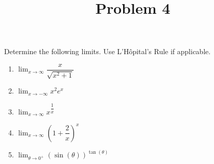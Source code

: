 \documentclass{ximera}
\title[Problem 4]{Problem 4}
\begin{document}
\begin{abstract} \end{abstract}
\maketitle

\begin{problem}
  Determine the following limits.
  Use L'H\^{o}pital's Rule if applicable.
  \begin{enumerate}
  
  \item  $\displaystyle \lim_{x \to \infty} \dfrac{x}{\sqrt{x^2 + 1}}  $ \\

  \item  $\displaystyle \lim_{x \to - \infty} x^2 e^x $ \\
  \item  $\displaystyle \lim_{x \to \infty} x^{\dfrac{1}{x}} $ \\
    \item $\displaystyle \lim_{x \to \infty} \left(1+\dfrac{2}{x}\right)^x$ \\
    \item $\displaystyle \lim_{\theta \to 0^+} \left(\sin(\theta)\right)^{\tan(\theta)}$ \\
        \end{enumerate}
\end{problem}
\end{document}
